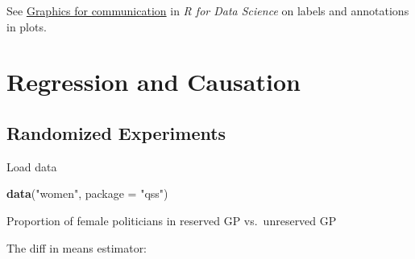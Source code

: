 \documentclass[]{book}
\newenvironment{Shaded}{\begin{snugshade}}{\end{snugshade}}
\newcommand{\KeywordTok}[1]{\textcolor[rgb]{0.13,0.29,0.53}{\textbf{#1}}}
\newcommand{\DataTypeTok}[1]{\textcolor[rgb]{0.13,0.29,0.53}{#1}}
\newcommand{\DecValTok}[1]{\textcolor[rgb]{0.00,0.00,0.81}{#1}}
\newcommand{\StringTok}[1]{\textcolor[rgb]{0.31,0.60,0.02}{#1}}
\newcommand{\CommentTok}[1]{\textcolor[rgb]{0.56,0.35,0.01}{\textit{#1}}}
\newcommand{\OperatorTok}[1]{\textcolor[rgb]{0.81,0.36,0.00}{\textbf{#1}}}
\newcommand{\NormalTok}[1]{#1}
\theoremstyle{definition}
\theoremstyle{definition}
\theoremstyle{definition}
\theoremstyle{remark}
\begin{document}
See
\href{http://r4ds.had.co.nz/graphics-for-communication.html\#label}{Graphics
for communication} in \emph{R for Data Science} on labels and
annotations in plots.

\section{Regression and Causation}\label{regression-and-causation}

\subsection{Randomized Experiments}\label{randomized-experiments}

Load data

\begin{Shaded}
\begin{Highlighting}[]
\KeywordTok{data}\NormalTok{(}\StringTok{"women"}\NormalTok{, }\DataTypeTok{package =} \StringTok{"qss"}\NormalTok{)}
\end{Highlighting}
\end{Shaded}

Proportion of female politicians in reserved GP vs.~unreserved GP

\begin{Shaded}
\end{Shaded}

The diff in means estimator:

\begin{Shaded}
\end{Shaded}
\end{document}
